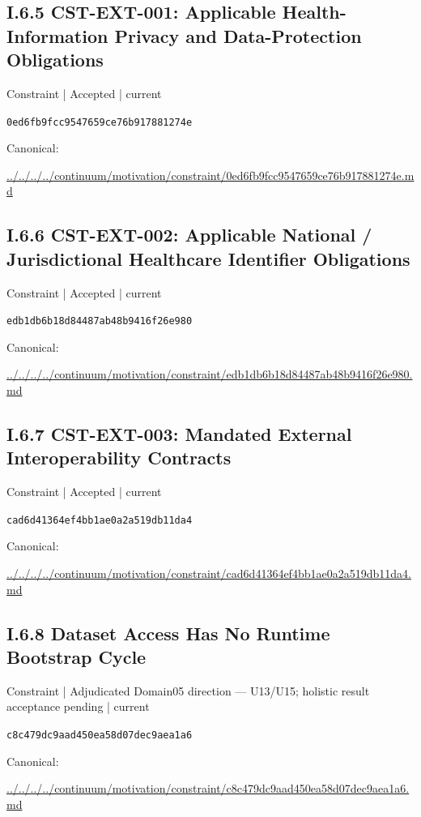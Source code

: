 \documentclass[10pt,a4paper]{article}
\begin{document}
\subsection*{I.6.5 CST-EXT-001: Applicable Health-Information Privacy and Data-Protection Obligations}
\label{element-0ed6fb9fcc9547659ce76b917881274e}
{\small Constraint | Accepted | current}\par
\texttt{0ed6fb9fcc9547659ce76b917881274e}\par
Canonical: \par
{\footnotesize\url{../../../../continuum/motivation/constraint/0ed6fb9fcc9547659ce76b917881274e.md}}\par
\subsection*{I.6.6 CST-EXT-002: Applicable National / Jurisdictional Healthcare Identifier Obligations}
\label{element-edb1db6b18d84487ab48b9416f26e980}
{\small Constraint | Accepted | current}\par
\texttt{edb1db6b18d84487ab48b9416f26e980}\par
Canonical: \par
{\footnotesize\url{../../../../continuum/motivation/constraint/edb1db6b18d84487ab48b9416f26e980.md}}\par
\subsection*{I.6.7 CST-EXT-003: Mandated External Interoperability Contracts}
\label{element-cad6d41364ef4bb1ae0a2a519db11da4}
{\small Constraint | Accepted | current}\par
\texttt{cad6d41364ef4bb1ae0a2a519db11da4}\par
Canonical: \par
{\footnotesize\url{../../../../continuum/motivation/constraint/cad6d41364ef4bb1ae0a2a519db11da4.md}}\par
\subsection*{I.6.8 Dataset Access Has No Runtime Bootstrap Cycle}
\label{element-c8c479dc9aad450ea58d07dec9aea1a6}
{\small Constraint | Adjudicated Domain05 direction — U13/U15; holistic result acceptance pending | current}\par
\texttt{c8c479dc9aad450ea58d07dec9aea1a6}\par
Canonical: \par
{\footnotesize\url{../../../../continuum/motivation/constraint/c8c479dc9aad450ea58d07dec9aea1a6.md}}\par
\end{document}
